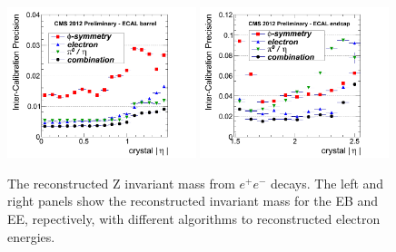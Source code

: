 \begin{figure}
 \centering
\includegraphics[width=0.49\textwidth]{CMS_DetectorFigures/2012EBprecWithCombV3.png}
\includegraphics[width=0.49\textwidth]{CMS_DetectorFigures/2012EEprecWithCombV3.png}
\caption{The reconstructed Z invariant mass from $e^{+}e^{-}$
  decays. The left and right panels show the reconstructed invariant mass for
  the EB and EE, repectively, with different algorithms to reconstructed electron energies.\label{fig:ECAL_ICPrecision}}
\end{figure}

